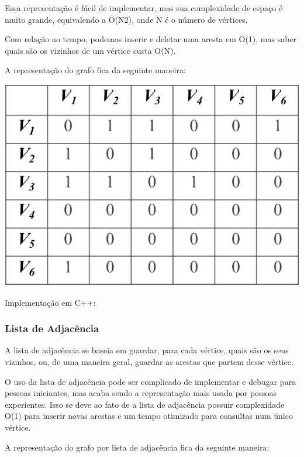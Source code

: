 \documentclass[a4paper,12pt]{article}
\begin{document}
\indent Essa representação é fácil de implementar, mas sua complexidade de espaço é muito grande, equivalendo a O(N2), onde N é o número de vértices.

\indent Com relação ao tempo, podemos inserir e deletar uma aresta em O(1), mas saber quais são os vizinhos de um vértice custa O(N).

\indent A representação do grafo fica da seguinte maneira:

\begin{center}
  \includegraphics[width=\linewidth/2]{figures/grafos/representacao_matriz_adj.png}
\end{center}

\noindent Implementação em C++:


\subsubsection{Lista de Adjacência}

\indent\indent A lista de adjacência se baseia em guardar, para cada vértice, quais são os seus vizinhos, ou, de uma maneira geral, guardar as arestas que partem desse vértice.

\indent O uso da lista de adjacência pode ser complicado de implementar e debugar para pessoas iniciantes, mas acaba sendo a representação mais usada por pessoas experientes. Isso se deve ao fato de a lista de adjacência possuir complexidade O(1) para inserir novas arestas e um tempo otimizado para consultas num único vértice.

\indent A representação do grafo por lista de adjacência fica da seguinte maneira:
\end{document}
